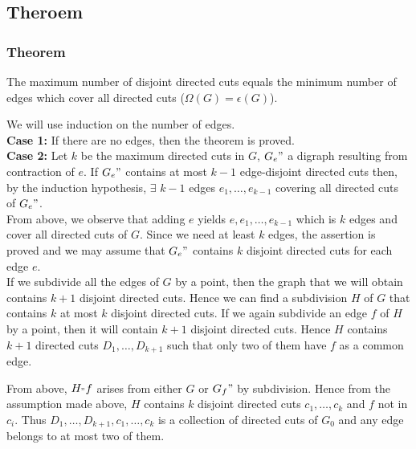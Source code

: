 \documentclass[8pt]{beamer}
\begin{document}
\subsection{Theroem}
\begin{frame}
\frametitle{Theorem}
    
\begin{Lucchesi_and_Younger}
The maximum number of disjoint directed cuts equals the minimum number of edges which cover all directed cuts ($\Omega(G) = \epsilon(G)$).
\end{Lucchesi_and_Younger}

\end{frame}

\begin{frame}
We will use induction on the number of edges. \\
\textbf{Case 1:} If there are no edges, then the theorem is proved. \\
\textbf{Case 2:} Let $k$ be the maximum directed cuts in $G$, $G_e"$ a digraph 
resulting from contraction of $e$. 
If $G_e"$ contains at most $k-1$ edge-disjoint directed cuts then, by the induction hypothesis, $\exists$ $k-1$ edges $e_1,\dots,e_{k-1}$ covering all directed cuts of $G_e"$. \\
From above, we observe that adding $e$ yields $e, e_1,\dots,e_{k-1}$ which is $k$ edges and cover all directed cuts of $G$. Since we need at least $k$ edges, the assertion is proved and we may assume that $G_e"$ contains $k$ disjoint directed cuts for each edge $e$.\\

If we subdivide all the edges of $G$ by a point, then the graph that we will obtain contains $k+1$ disjoint directed cuts. Hence we can find a subdivision $H$ of $G$ that contains $k$ at most $k$ disjoint directed cuts. If we again subdivide an edge $f$ of $H$ by a point, then it will contain $k+1$ disjoint directed cuts. Hence $H$ contains $k+1$ directed cuts $D_1,\dots,D_{k+1}$ such that only two of them have $f$ as a common edge. 

From above, $H_"f$ arises from either $G$ or $G_f"$ by subdivision. Hence from the assumption made above, $H$ contains $k$ disjoint directed cuts $c_1,\dots,c_k$ and $f$ not in $c_i$. Thus $D_1,\dots,D_{k+1},c_1,\dots,c_k$ is a collection of directed cuts of $G_0$ and any edge belongs to at most two of them. 

\end{frame}
\end{document}
